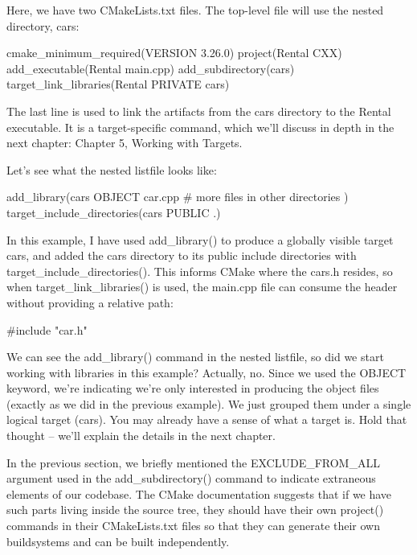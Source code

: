 Here, we have two CMakeLists.txt files. The top-level file will use the nested directory, cars:


\begin{cmake}
cmake_minimum_required(VERSION 3.26.0)
project(Rental CXX)
add_executable(Rental main.cpp)
add_subdirectory(cars)
target_link_libraries(Rental PRIVATE cars)
\end{cmake}

The last line is used to link the artifacts from the cars directory to the Rental executable. It is a target-specific command, which we’ll discuss in depth in the next chapter: Chapter 5, Working with Targets.

Let’s see what the nested listfile looks like:


\begin{cmake}
add_library(cars OBJECT
    car.cpp
# more files in other directories
)
target_include_directories(cars PUBLIC .)
\end{cmake}

In this example, I have used add\_library() to produce a globally visible target cars, and added the cars directory to its public include directories with target\_include\_directories(). This informs CMake where the cars.h resides, so when target\_link\_libraries() is used, the main.cpp file can consume the header without providing a relative path:

\begin{cpp}
#include "car.h"
\end{cpp}

We can see the add\_library() command in the nested listfile, so did we start working with libraries in this example? Actually, no. Since we used the OBJECT keyword, we’re indicating we’re only interested in producing the object files (exactly as we did in the previous example). We just grouped them under a single logical target (cars). You may already have a sense of what a target is. Hold that thought – we’ll explain the details in the next chapter.


In the previous section, we briefly mentioned the EXCLUDE\_FROM\_ALL argument used in the add\_subdirectory() command to indicate extraneous elements of our codebase. The CMake documentation suggests that if we have such parts living inside the source tree, they should have their own project() commands in their CMakeLists.txt files so that they can generate their own buildsystems and can be built independently.

